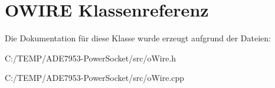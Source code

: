 \hypertarget{class_o_w_i_r_e}{}\section{O\+W\+I\+RE Klassenreferenz}
\label{class_o_w_i_r_e}


Die Dokumentation für diese Klasse wurde erzeugt aufgrund der Dateien\+:\begin{DoxyCompactItemize}
\item 
C\+:/\+T\+E\+M\+P/\+A\+D\+E7953-\/\+Power\+Socket/src/o\+Wire.\+h\item 
C\+:/\+T\+E\+M\+P/\+A\+D\+E7953-\/\+Power\+Socket/src/o\+Wire.\+cpp\end{DoxyCompactItemize}
